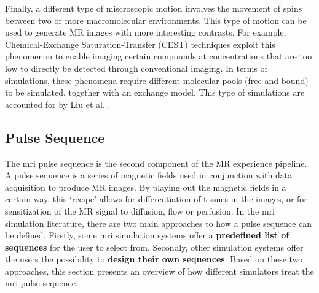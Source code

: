 \hfill

Finally, a different type of miscroscopic motion involves the movement of spins between two or more macromolecular environments.
This type of motion can be used to generate MR images with more interesting contrasts.
For example, Chemical-Exchange Saturation-Transfer (CEST) techniques exploit this phenomenon to enable imaging certain compounds at concentrations that are too low to directly be detected through conventional imaging.
In terms of simulations, these phenomena require different molecular pools (free and bound) to be simulated, together with an exchange model.
This type of simulations are accounted for by Liu et al. \cite{Liu2017}.

\hfill

\subsection{Pulse Sequence}

The \ac{mri} pulse sequence is the second component of the MR experience pipeline.
A pulse sequence is a series of magnetic fields used in conjunction with data acquisition to produce MR images. 
By playing out the magnetic fields in a certain way, this `recipe' allows for differentiation of tissues in the images, or for sensitization of the MR signal to diffusion, flow or perfusion.
In the \ac{mri} simulation literature, there are two main approaches to how a pulse sequence can be defined.
Firstly, some \ac{mri} simulation systems offer a \textbf{predefined list of sequences} for the user to select from.
Secondly, other simulation systems offer the users the possibility to \textbf{design their own sequences}.
Based on these two approaches, this section presents an overview of how different simulators treat the \ac{mri} pulse sequence.

